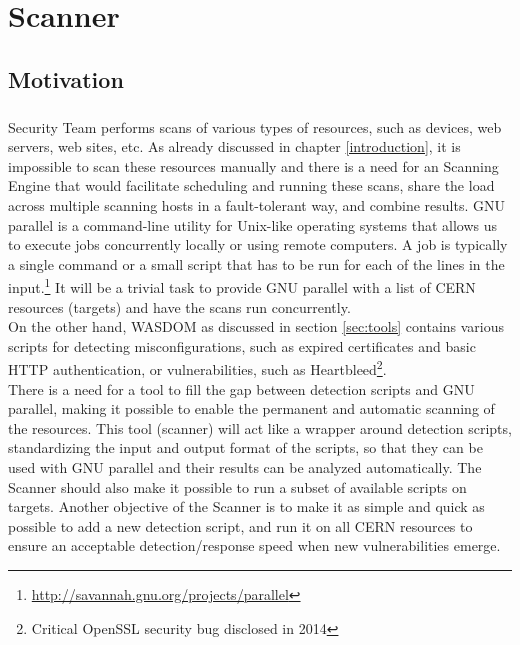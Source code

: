 \chapter{Scanner}
\label{chap4-scanner}
\thispagestyle{empty}

\section{Motivation}

\paragraph{}

Security Team performs scans of various types of resources, such as devices, web servers, web sites, etc. As already discussed in chapter \ref{introduction}, it is impossible to scan these resources manually and there is a need for an Scanning Engine that would facilitate scheduling and running these scans, share the load across multiple scanning hosts in a fault-tolerant way, and combine results.
GNU parallel is a command-line utility for Unix-like operating systems that allows us to execute jobs concurrently locally or using remote computers. A job is typically a single command or a small script that has to be run for each of the lines in the input.\footnote{\url{http://savannah.gnu.org/projects/parallel}} It will be a trivial task to provide GNU parallel with a list of CERN resources (targets) and have the scans run concurrently.
\\ 
On the other hand, WASDOM as discussed in section \ref{sec:tools} contains various scripts for detecting misconfigurations, such as expired certificates and basic HTTP authentication, or vulnerabilities, such as Heartbleed\footnote{Critical OpenSSL security bug disclosed in 2014}. 
\\
There is a need for a tool to fill the gap between detection scripts and GNU parallel, making it possible to enable the permanent and automatic scanning of the resources. This tool (scanner) will act like a wrapper around detection scripts, standardizing the input and output format of the scripts, so that they can be used with GNU parallel and their results can be analyzed automatically. The Scanner should also make it possible to run a subset of available scripts on targets. Another objective of the Scanner is to make it as simple and quick as possible to add a new detection script, and run it on all CERN resources to ensure an acceptable detection/response speed when new vulnerabilities emerge.

